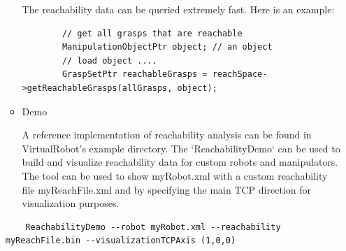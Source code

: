 \begin{itemize}
\begin{itemize}
   The reachability data can be queried extremely fast. Here is an example: 
    \begin{lstlisting}
        // get all grasps that are reachable
        ManipulationObjectPtr object; // an object
        // load object ....
        GraspSetPtr reachableGrasps = reachSpace->getReachableGrasps(allGrasps, object); 
    \end{lstlisting}
     \item Demo  \par
     A reference implementation of reachability analysis can be found in VirtualRobot's example directory. The `ReachabilityDemo` can be used to build and visualize reachability data for custom robots and manipulators. The tool can be used to show myRobot.xml with a custom reachability file myReachFile.xml and by specifying the main TCP direction for visualization purposes. 
     \end{itemize} 
     \begin{lstlisting}
    ReachabilityDemo --robot myRobot.xml --reachability myReachFile.bin --visualizationTCPAxis (1,0,0) 
        \end{lstlisting} 
 

\end{itemize}
